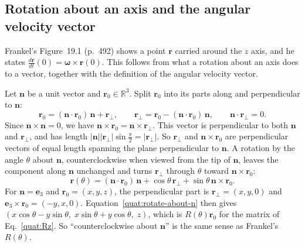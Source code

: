 \subsection{Rotation about an axis and the angular velocity vector}
Frankel's Figure~19.1 (p.~492) shows a point $\mathbf r$ carried around
the $z$ axis, and he states $\frac{d\mathbf r}{dt}(0)=\boldsymbol\omega
\times\mathbf r(0)$. This follows from what a rotation about an axis does
to a vector, together with the definition of the angular velocity vector.

Let $\mathbf n$ be a unit vector and $\mathbf r_0\in\mathbb R^3$. Split
$\mathbf r_0$ into its parts along and perpendicular to $\mathbf n$:
\begin{equation}\label{quat:split}
 \mathbf r_0=(\mathbf n\cdot\mathbf r_0)\,\mathbf n+\mathbf r_\perp ,
 \qquad \mathbf r_\perp=\mathbf r_0-(\mathbf n\cdot\mathbf r_0)\,\mathbf n,
 \qquad \mathbf n\cdot\mathbf r_\perp=0 .
\end{equation}
Since $\mathbf n\times\mathbf n=0$, we have
$\mathbf n\times\mathbf r_0=\mathbf n\times\mathbf r_\perp$. This vector is
perpendicular to both $\mathbf n$ and $\mathbf r_\perp$, and has length
$|\mathbf n||\mathbf r_\perp|\sin\frac{\pi}{2}=|\mathbf r_\perp|$. So
$\mathbf r_\perp$ and $\mathbf n\times\mathbf r_0$ are perpendicular
vectors of equal length spanning the plane perpendicular to $\mathbf n$.
A rotation by the angle $\theta$ about $\mathbf n$, counterclockwise when
viewed from the tip of $\mathbf n$, leaves the component along $\mathbf n$
unchanged and turns $\mathbf r_\perp$ through $\theta$ toward
$\mathbf n\times\mathbf r_0$:
\begin{equation}\label{quat:rotate-about-n}
 \mathbf r(\theta)=(\mathbf n\cdot\mathbf r_0)\,\mathbf n
 +\cos\theta\,\mathbf r_\perp+\sin\theta\,\mathbf n\times\mathbf r_0 .
\end{equation}
For $\mathbf n=\mathbf e_3$ and $\mathbf r_0=(x,y,z)$, the perpendicular
part is $\mathbf r_\perp=(x,y,0)$ and $\mathbf e_3\times\mathbf r_0=(-y,x,0)$.
Equation~\eqref{quat:rotate-about-n} then gives
$(x\cos\theta-y\sin\theta,\;x\sin\theta+y\cos\theta,\;z)$, which is
$R(\theta)\mathbf r_0$ for the matrix of Eq.~\eqref{quat:Rz}. So
``counterclockwise about $\mathbf n$'' is the same sense as Frankel's
$R(\theta)$.

